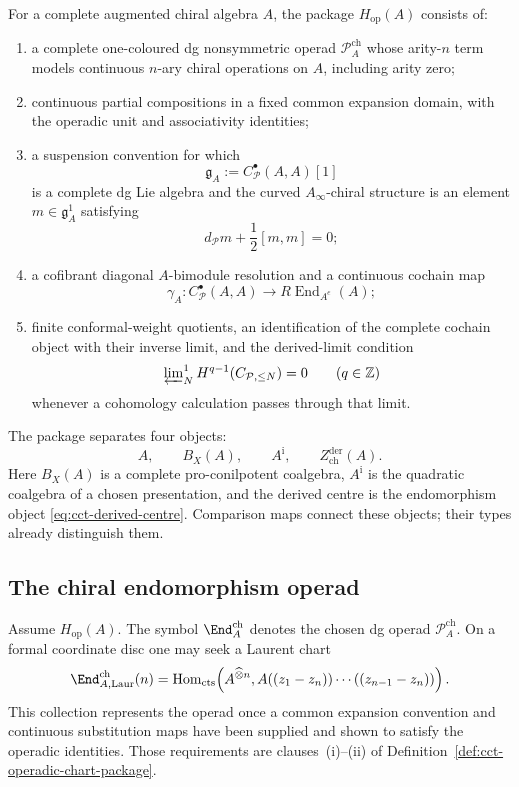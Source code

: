 \begin{definition}
\label{def:cct-operadic-chart-package}
For a complete augmented chiral algebra \(A\), the package
\(H_{\mathrm{op}}(A)\) consists of:
\begin{enumerate}[label=\textup{(\roman*)}]
\item a complete one-coloured dg nonsymmetric operad
 \(\mathcal P_A^{\mathrm{ch}}\) whose arity-\(n\) term models continuous
 \(n\)-ary chiral operations on \(A\), including arity zero;
\item continuous partial compositions in a fixed common expansion
 domain, with the operadic unit and associativity identities;
\item a suspension convention for which
 \[
 \mathfrak g_A
 :=
 C^\bullet_{\mathcal P}(A,A)[1]
 \]
 is a complete dg Lie algebra and the curved \(A_\infty\)-chiral
 structure is an element \(m\in\mathfrak g_A^1\) satisfying
 \[
 d_{\mathcal P}m+\frac12[m,m]=0;
 \]
\item a cofibrant diagonal \(A\)-bimodule resolution and a continuous
 cochain map
 \[
 \gamma_A\colon C^\bullet_{\mathcal P}(A,A)
 \longrightarrow R\operatorname{End}_{A^e}(A);
 \]
\item finite conformal-weight quotients, an identification of the
 complete cochain object with their inverse limit, and the derived-limit
 condition
 \[
  \varprojlim\nolimits_N^1 H^{q-1}(C_{\mathcal P,\leq N})=0
  \qquad(q\in\mathbb Z)
 \]
 whenever a cohomology calculation passes through that limit.
\end{enumerate}
\end{definition}

The package separates four objects:
\[
 A,\qquad B_X(A),\qquad A^{\mathrm i},\qquad
 Z^{\mathrm{der}}_{\mathrm{ch}}(A).
\]
Here \(B_X(A)\) is a complete pro-conilpotent coalgebra,
\(A^{\mathrm i}\) is the quadratic coalgebra of a chosen presentation,
and the derived centre is the endomorphism object
\eqref{eq:cct-derived-centre}.  Comparison maps connect these objects;
their types already distinguish them.

\subsection{The chiral endomorphism operad}
\label{subsec:chiral-endo-operad}

\begin{definition}
\label{def:chiral-endomorphism-operad}
Assume \(H_{\mathrm{op}}(A)\).  The symbol
\(\End_A^{\mathrm{ch}}\) denotes the chosen dg operad
\(\mathcal P_A^{\mathrm{ch}}\).  On a formal coordinate disc one may
seek a Laurent chart
\[
 \End_{A,\mathrm{Laur}}^{\mathrm{ch}}(n)
 =
 \operatorname{Hom}_{\mathrm{cts}}
 \!\left(A^{\widehat\otimes n},
 A((z_1-z_n))\cdots((z_{n-1}-z_n))\right).
\]
This collection represents the operad once a common expansion
convention and continuous substitution maps have been supplied and
shown to satisfy the operadic identities.  Those requirements are
clauses~\textup{(i)}--\textup{(ii)} of
Definition~\ref{def:cct-operadic-chart-package}.
\end{definition}

